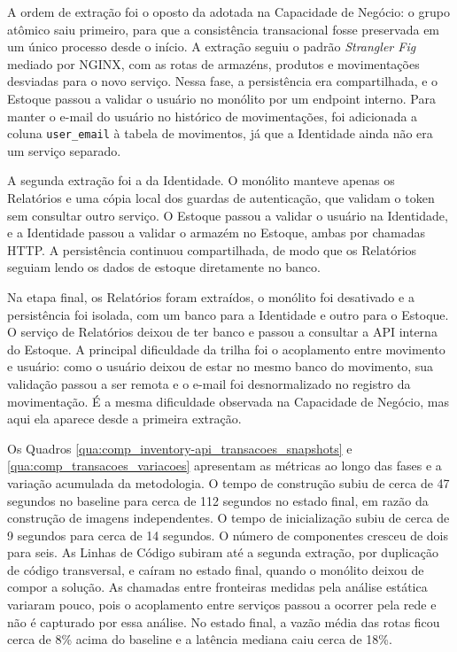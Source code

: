 A ordem de extração foi o oposto da adotada na Capacidade de Negócio: o grupo atômico saiu primeiro, para que a consistência transacional fosse preservada em um único processo desde o início. A extração seguiu o padrão \textit{Strangler Fig} mediado por NGINX, com as rotas de armazéns, produtos e movimentações desviadas para o novo serviço. Nessa fase, a persistência era compartilhada, e o Estoque passou a validar o usuário no monólito por um endpoint interno. Para manter o e-mail do usuário no histórico de movimentações, foi adicionada a coluna \texttt{user\_email} à tabela de movimentos, já que a Identidade ainda não era um serviço separado.

A segunda extração foi a da Identidade. O monólito manteve apenas os Relatórios e uma cópia local dos guardas de autenticação, que validam o token sem consultar outro serviço. O Estoque passou a validar o usuário na Identidade, e a Identidade passou a validar o armazém no Estoque, ambas por chamadas HTTP. A persistência continuou compartilhada, de modo que os Relatórios seguiam lendo os dados de estoque diretamente no banco.

Na etapa final, os Relatórios foram extraídos, o monólito foi desativado e a persistência foi isolada, com um banco para a Identidade e outro para o Estoque. O serviço de Relatórios deixou de ter banco e passou a consultar a API interna do Estoque. A principal dificuldade da trilha foi o acoplamento entre movimento e usuário: como o usuário deixou de estar no mesmo banco do movimento, sua validação passou a ser remota e o e-mail foi desnormalizado no registro da movimentação. É a mesma dificuldade observada na Capacidade de Negócio, mas aqui ela aparece desde a primeira extração.

Os Quadros \ref{qua:comp_inventory-api_transacoes_snapshots} e \ref{qua:comp_transacoes_variacoes} apresentam as métricas ao longo das fases e a variação acumulada da metodologia. O tempo de construção subiu de cerca de 47 segundos no baseline para cerca de 112 segundos no estado final, em razão da construção de imagens independentes. O tempo de inicialização subiu de cerca de 9 segundos para cerca de 14 segundos. O número de componentes cresceu de dois para seis. As Linhas de Código subiram até a segunda extração, por duplicação de código transversal, e caíram no estado final, quando o monólito deixou de compor a solução. As chamadas entre fronteiras medidas pela análise estática variaram pouco, pois o acoplamento entre serviços passou a ocorrer pela rede e não é capturado por essa análise. No estado final, a vazão média das rotas ficou cerca de 8\% acima do baseline e a latência mediana caiu cerca de 18\%.

